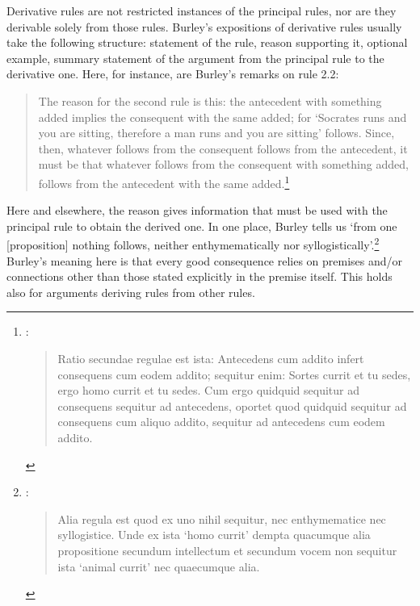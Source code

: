 \documentclass[]{birkjour}
\begin{document}
Derivative rules are not restricted instances of the principal rules, nor are they derivable solely from those rules. Burley's expositions of derivative rules usually take the following structure: statement of the rule, reason supporting it, optional example, summary statement of the argument from the principal rule to the derivative one. Here, for instance, are Burley's remarks on rule 2.2: 
\begin{quote}
	The reason for the second rule is this: the antecedent with something added implies the consequent with the same added; for `Socrates runs and you are sitting, therefore a man runs and you are sitting' follows. Since, then, whatever follows from the consequent follows from the antecedent, it must be that whatever follows from the consequent with something added, follows from the antecedent with the same added.\footnote{\autocite[p. 62.33-38]{BurleyDPAL}: \begin{quote}
			Ratio secundae regulae est ista: Antecedens cum addito infert consequens cum eodem addito; sequitur enim: Sortes currit et tu sedes, ergo homo currit et tu sedes. Cum ergo quidquid sequitur ad consequens sequitur ad antecedens, oportet quod quidquid sequitur ad consequens cum aliquo addito, sequitur ad antecedens cum eodem addito.
		\end{quote}}
\end{quote}

Here and elsewhere, the reason gives information that must be used with the principal rule to obtain the derived one. In one place, Burley tells us `from one [proposition] nothing follows, neither enthymematically nor syllogistically'.\footnote{\autocite[p. 147, par. 130]{Green-Pedersen1980b}: \begin{quote}
		Alia regula est quod ex uno nihil sequitur, nec enthymematice nec syllogistice. Unde ex ista `homo currit' dempta quacumque alia propositione secundum intellectum et secundum vocem non sequitur ista `animal currit' nec quaecumque alia.
	\end{quote}} Burley's meaning here is that every good consequence relies on premises and/or connections other than those stated explicitly in the premise itself. This holds also for arguments deriving rules from other rules. 

\end{document}
